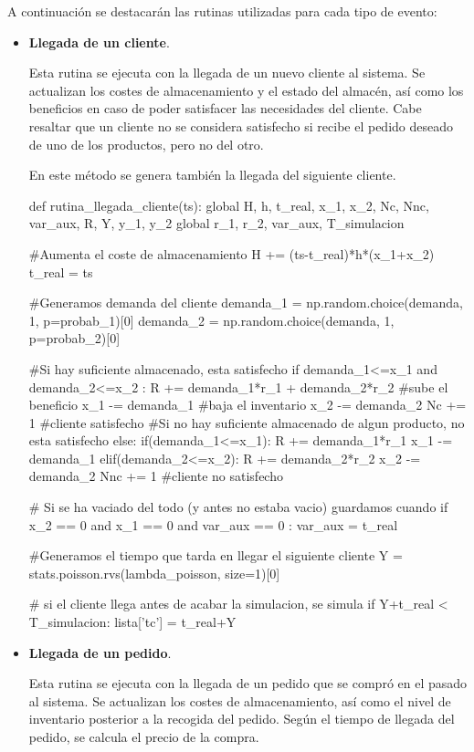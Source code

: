 \documentclass[a4paper,12pt]{article}
\begin{document}
	A continuación se destacarán las rutinas utilizadas para cada tipo de evento:
	\begin{itemize}
		\item \textbf{Llegada de un cliente}. 
		
		Esta rutina se ejecuta con la llegada de un nuevo cliente al sistema. Se actualizan los costes de almacenamiento y el estado del almacén, así como los beneficios en caso de poder satisfacer las necesidades del cliente. 
		Cabe resaltar que un cliente no se considera satisfecho si recibe el pedido deseado de uno de los productos, pero no del otro.
		
		En este método se genera también la llegada del siguiente cliente.
		
		\begin{python}
def rutina_llegada_cliente(ts):
	global H, h, t_real, x_1, x_2, Nc, Nnc, var_aux, R, Y, y_1, y_2
	global r_1, r_2, var_aux, T_simulacion
	
	#Aumenta el coste de almacenamiento
	H += (ts-t_real)*h*(x_1+x_2)
	t_real = ts

	
	#Generamos demanda del cliente
	demanda_1 = np.random.choice(demanda, 1, p=probab_1)[0]
	demanda_2 = np.random.choice(demanda, 1, p=probab_2)[0]
	
	#Si hay suficiente almacenado, esta satisfecho
	if demanda_1<=x_1 and demanda_2<=x_2 :
		R += demanda_1*r_1 + demanda_2*r_2 #sube el beneficio
		x_1 -= demanda_1	 #baja el inventario
		x_2 -= demanda_2
		Nc += 1 #cliente satisfecho
	#Si no hay suficiente almacenado de algun producto, no esta satisfecho
	else:
		if(demanda_1<=x_1):
			R += demanda_1*r_1
			x_1 -= demanda_1
		elif(demanda_2<=x_2):
			R += demanda_2*r_2
			x_2 -= demanda_2
		Nnc += 1 #cliente no satisfecho
	
	# Si se ha vaciado del todo (y antes no estaba vacio) guardamos cuando
	if x_2 == 0 and x_1 == 0 and var_aux == 0 :
		var_aux = t_real

	
	#Generamos el tiempo que tarda en llegar el siguiente cliente
	Y = stats.poisson.rvs(lambda_poisson, size=1)[0]
	
	# si el cliente llega antes de acabar la simulacion, se simula
	if Y+t_real < T_simulacion:
		lista['tc'] = t_real+Y
		\end{python}
	
	\item \textbf{Llegada de un pedido}. 
	
	Esta rutina se ejecuta con la llegada de un pedido que se compró en el pasado al sistema. Se actualizan los costes de almacenamiento, así como el nivel de inventario posterior a la recogida del pedido. Según el tiempo de llegada del pedido, se calcula el precio de la compra.
	

\end{itemize}
\end{document}
